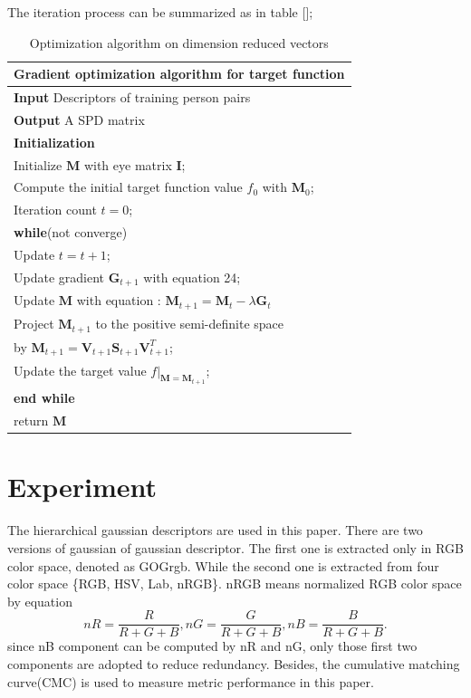 \documentclass[conference,compsoc]{IEEEtran}
\begin{document}
 The iteration process can be summarized as in table [];
 \begin{table}
 \centering
 \caption{Optimization algorithm on dimension reduced vectors }
 \begin{tabular}{l}
 \hline 
 \multicolumn{1}{l}{\textbf{Gradient optimization algorithm for target function}} \\
 \hline
 \textbf{Input} Descriptors of training person pairs \\
 \textbf{Output} A SPD matrix\\
 \textbf{Initialization} \\
 Initialize $\bm{M}$ with eye matrix $\bm{I}$; \\
 Compute the initial target function value $f_0$ with $\bm{M}_0$;\\
 Iteration count  $t = 0$;\\

 \textbf{while}(not converge)\\
 \indent Update $t =  t + 1$;\\
 \indent Update gradient $\bm{G}_{t+1}$ with equation 24;\\
 \indent Update $\bm{M}$ with equation : $\bm{M}_{t+1} = \bm{M}_{t} - \lambda\bm{G}_t$\\
 \indent Project $\bm{M}_{t+1}$ to the positive semi-definite space \\ 
 \indent \indent by $\bm{M}_{t+1}= \bm{V}_{t+1}\bm{S}_{t+1}\bm{V}^T_{t+1}$;\\
 \indent Update the target value $f|_{\bm{M} = \bm{M}_{t+1}}$;\\
 \textbf{end while}  \\
 return $\bm{M}$\\
 \hline

 \end{tabular} 
 \end{table}
 
\section{Experiment}
The hierarchical gaussian descriptors \cite{GOG} are used in this paper. There are two versions of gaussian of gaussian descriptor. The first one is extracted only in RGB color space, denoted as GOGrgb. While the second one is extracted from four color space \{RGB, HSV, Lab, nRGB\}. nRGB means normalized RGB color space by equation 
\begin{equation}
nR = \frac{R}{R+G+B}, nG = \frac{G}{R+G+B}, nB = \frac{B}{R+G+B}.
\end{equation}
since nB component can be computed by nR and nG, only those first two components are adopted to reduce redundancy. Besides, the cumulative matching curve(CMC) is used to measure metric performance in this paper.
\end{document}
